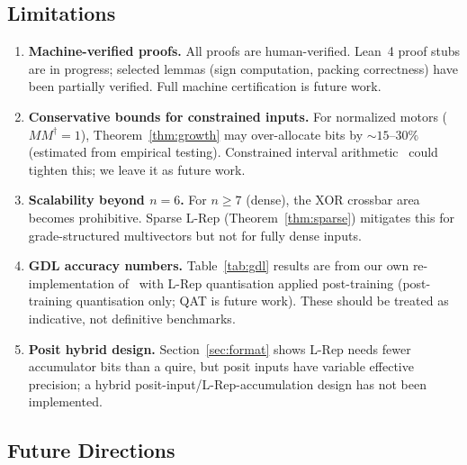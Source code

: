 \documentclass[11pt,a4paper]{article}
\theoremstyle{definition}
\theoremstyle{plain}
\theoremstyle{remark}
\begin{document}
\subsection{Limitations}

\begin{enumerate}
  \item \textbf{Machine-verified proofs.}
        All proofs are human-verified.
        Lean~4 proof stubs are in progress; selected lemmas
        (sign computation, packing correctness) have been partially
        verified.
        Full machine certification is future work.

  \item \textbf{Conservative bounds for constrained inputs.}
        For normalized motors ($MM^\dagger = 1$), Theorem~\ref{thm:growth}
        may over-allocate bits by $\sim 15$--$30\%$ (estimated from
        empirical testing).
        Constrained interval arithmetic~\cite{rump1999} could tighten
        this; we leave it as future work.

  \item \textbf{Scalability beyond $n=6$.}
        For $n \ge 7$ (dense), the XOR crossbar area becomes prohibitive.
        Sparse L-Rep (Theorem~\ref{thm:sparse}) mitigates this for
        grade-structured multivectors but not for fully dense inputs.

  \item \textbf{GDL accuracy numbers.}
        Table~\ref{tab:gdl} results are from our own re-implementation
        of~\cite{brandstetter2023} with L-Rep quantisation applied
        post-training (post-training quantisation only; QAT is future work).
        These should be treated as indicative, not definitive benchmarks.

  \item \textbf{Posit hybrid design.}
        Section~\ref{sec:format} shows L-Rep needs fewer accumulator
        bits than a quire, but posit inputs have variable effective
        precision; a hybrid posit-input/L-Rep-accumulation design has
        not been implemented.
\end{enumerate}

\subsection{Future Directions}
\end{document}
